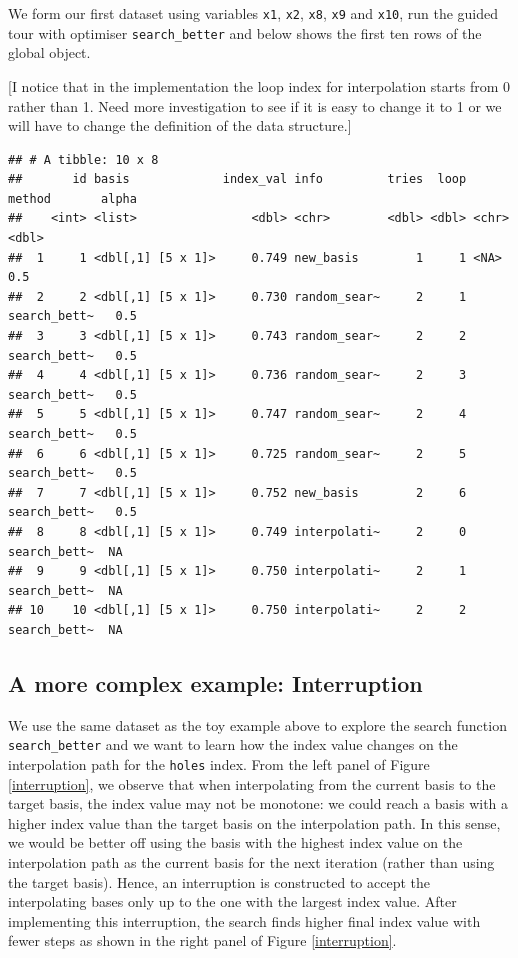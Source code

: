 \documentclass[12pt]{article}
\begin{document}
We form our first dataset using variables \texttt{x1}, \texttt{x2},
\texttt{x8}, \texttt{x9} and \texttt{x10}, run the guided tour with
optimiser \texttt{search\_better} and below shows the first ten rows of
the global object.

{[}I notice that in the implementation the loop index for interpolation
starts from 0 rather than 1. Need more investigation to see if it is
easy to change it to 1 or we will have to change the definition of the
data structure.{]}

\begin{verbatim}
## # A tibble: 10 x 8
##       id basis             index_val info         tries  loop method       alpha
##    <int> <list>                <dbl> <chr>        <dbl> <dbl> <chr>        <dbl>
##  1     1 <dbl[,1] [5 x 1]>     0.749 new_basis        1     1 <NA>           0.5
##  2     2 <dbl[,1] [5 x 1]>     0.730 random_sear~     2     1 search_bett~   0.5
##  3     3 <dbl[,1] [5 x 1]>     0.743 random_sear~     2     2 search_bett~   0.5
##  4     4 <dbl[,1] [5 x 1]>     0.736 random_sear~     2     3 search_bett~   0.5
##  5     5 <dbl[,1] [5 x 1]>     0.747 random_sear~     2     4 search_bett~   0.5
##  6     6 <dbl[,1] [5 x 1]>     0.725 random_sear~     2     5 search_bett~   0.5
##  7     7 <dbl[,1] [5 x 1]>     0.752 new_basis        2     6 search_bett~   0.5
##  8     8 <dbl[,1] [5 x 1]>     0.749 interpolati~     2     0 search_bett~  NA  
##  9     9 <dbl[,1] [5 x 1]>     0.750 interpolati~     2     1 search_bett~  NA  
## 10    10 <dbl[,1] [5 x 1]>     0.750 interpolati~     2     2 search_bett~  NA
\end{verbatim}

\hypertarget{a-more-complex-example-interruption}{%
\subsection{A more complex example:
Interruption}\label{a-more-complex-example-interruption}}

We use the same dataset as the toy example above to explore the search
function \texttt{search\_better} and we want to learn how the index
value changes on the interpolation path for the \texttt{holes} index.
From the left panel of Figure \ref{interruption}, we observe that when
interpolating from the current basis to the target basis, the index
value may not be monotone: we could reach a basis with a higher index
value than the target basis on the interpolation path. In this sense, we
would be better off using the basis with the highest index value on the
interpolation path as the current basis for the next iteration (rather
than using the target basis). Hence, an interruption is constructed to
accept the interpolating bases only up to the one with the largest index
value. After implementing this interruption, the search finds higher
final index value with fewer steps as shown in the right panel of Figure
\ref{interruption}.
\end{document}
